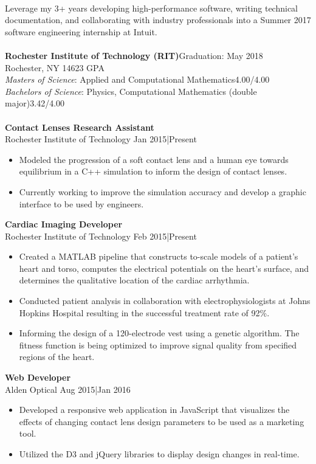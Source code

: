 \documentclass[10pt]{article}
\newcommand{\company}{Intuit}
\newcommand{\position}{software engineering }
\newcommand{\rsection}[1]{\noindent{\Large{\bfseries{\scshape\color{high}#1}}}}
\newcommand{\job}[4]{
	\textbf{#1}\\ #2 \hfill #3|#4 \vspace{-.05in}
}
\newcommand{\dash}{\item[-]\vspace{-.05cm}}
\begin{document}
\begin{minipage}[t]{0.7\linewidth}
\rsection{Objective}\\
Leverage my 3+ years developing high-performance software, writing technical documentation, and collaborating with industry professionals into a Summer 2017 \position internship at \company. \vspace{.25cm} \\ 
\rsection{Education}\\
\textbf{Rochester Institute of Technology (RIT)}\hfill Graduation: May 2018 \\Rochester, NY 14623 \hfill GPA\\
\textit{Masters of Science}: Applied and  Computational Mathematics\hfill 4.00/4.00 \\
\textit{Bachelors of Science}: Physics, Computational Mathematics (double major)\hfill 3.42/4.00\vspace{.25cm}\\ 
\rsection{Employment}\\
\job{Contact Lenses Research Assistant}{Rochester Institute of Technology}{Jan 2015}{Present}
\begin{itemize}
	\dash Modeled the progression of a soft contact lens and a human eye towards equilibrium in a C++ simulation to inform the design of contact lenses.
	\dash Currently working to improve the simulation accuracy and develop a graphic interface to be used by engineers.
\end{itemize}
\job{Cardiac Imaging Developer}{Rochester Institute of Technology}{Feb 2015}{Present}
\begin{itemize}
	\dash Created a MATLAB pipeline that constructs to-scale models of a patient's heart and torso, computes the electrical potentials on the heart's surface, and determines the qualitative location of the cardiac arrhythmia.
	\dash Conducted patient analysis in collaboration with electrophysiologists at Johns Hopkins Hospital resulting in the successful treatment rate of 92\%.  
	\dash Informing the design of a 120-electrode vest using a genetic algorithm. The fitness function is being optimized to improve signal quality from specified regions of the heart.  
\end{itemize}
\job{Web Developer}{Alden Optical}{Aug 2015}{Jan 2016}
\begin{itemize}
	\dash Developed a responsive web application in JavaScript that visualizes the effects of changing contact lens design parameters to be used as a marketing tool.  
	\dash Utilized the D3 and jQuery libraries to display design changes in real-time.

\end{itemize}
\end{minipage}
\end{document}
